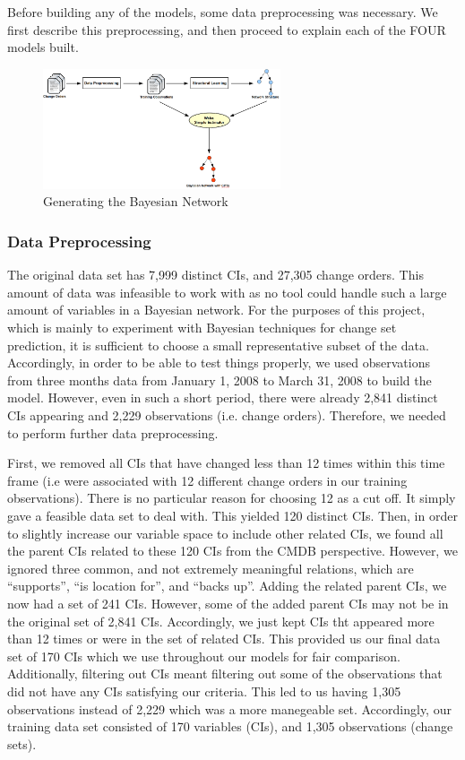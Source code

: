 \documentclass{article}
\begin{document}
Before building any of the models, some data preprocessing was necessary. We first describe this preprocessing, and then proceed to explain each of the FOUR
models built.


\begin{figure}[!t]
\centering
\includegraphics[width=7cm]{graphics/constructingmodel.png}
\caption{Generating the Bayesian Network}
\label{fig:process}
\end{figure}

\subsubsection{Data Preprocessing}
The original data set has 7,999 distinct CIs, and 27,305 change orders. This amount of data was infeasible to work with as no tool could handle such a large
amount of variables in a Bayesian network. For the purposes of this project, which is mainly to experiment with Bayesian techniques for change set prediction,
it is sufficient to choose a small representative subset of the data. Accordingly, in order to be able to test things properly, we used observations from three
months data from January 1, 2008 to March 31, 2008 to build the model. However, even in such a short period, there were already 2,841 distinct CIs appearing and
2,229 observations (i.e. change orders). Therefore, we needed to perform further data preprocessing. 

First, we removed all CIs that have changed less than 12 times within this time frame  (i.e were associated with 12 different change orders in our training
observations). There is no particular reason for choosing 12 as a cut off. It simply gave a feasible data set to deal with. This yielded 120 distinct CIs. Then,
in order to slightly increase our variable space to include other related CIs, we found all the parent CIs related to these 120 CIs from the CMDB perspective.
However, we ignored three common, and not extremely meaningful relations, which are  ``supports'', ``is location for'', and ``backs up''. Adding the related
parent CIs, we now had a set of 241 CIs. However, some of the added parent CIs may not be in the original set of 2,841 CIs. Accordingly, we just kept CIs tht
appeared more than 12 times or were in the set of related CIs. This provided us our final data set of 170 CIs which we use throughout our models for fair
comparison. Additionally, filtering out CIs meant filtering out some of the observations that did not have any CIs satisfying our criteria. This led to us
having 1,305 observations instead of 2,229 which was a more manegeable set. Accordingly, our training data set consisted of 170 variables (CIs), and 1,305
observations (change sets).
\end{document}
